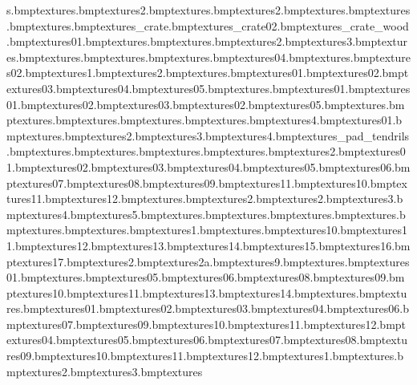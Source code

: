 s\electricfence.bmp textures\electricfencewall.bmp textures\electricfencewall2.bmp textures\electricfencewire.bmp textures\electricfencewire2.bmp textures\elephanteye.bmp textures\elephanttoes.bmp textures\elephantwrinkles.bmp textures\exp_crate.bmp textures\exp_crate02.bmp textures\exp_crate_wood.bmp textures\feather01.bmp textures\frozentreats.bmp textures\gate.bmp textures\grassedge2.bmp textures\grassedge3.bmp textures\grassjoiner.bmp textures\grasswedgeyel.bmp textures\spacestation.bmp textures\hitsignexplan.bmp textures\hubflowers04.bmp textures\hubfootylines.bmp textures\hubpath02.bmp textures\hutbrick1.bmp textures\hutbrick2.bmp textures\hutwallcolours.bmp textures\icecubed01.bmp textures\icecubed02.bmp textures\icecubed03.bmp textures\icecubed04.bmp textures\icecubed05.bmp textures\icewalkway.bmp textures\igloo01.bmp textures\jhutdoor01.bmp textures\jhutdoor02.bmp textures\jhuthatch03.bmp textures\jhutwin02.bmp textures\jhutwin05.bmp textures\leafgreen.bmp textures\leafred.bmp textures\leaftree.bmp textures\lhousewall.bmp textures\lifebuoy.bmp textures\lifehut4.bmp textures\lighthalo01.bmp textures\lillipad.bmp textures\lilo2.bmp textures\lilo3.bmp textures\lilo4.bmp textures\lily_pad_tendrils.bmp textures\logoicekingdome.bmp textures\magenta.bmp textures\metaledges.bmp textures\mountaincloud.bmp textures\mountaincloud2.bmp textures\orangerock01.bmp textures\orangerock02.bmp textures\orangerock03.bmp textures\orangerock04.bmp textures\orangerock05.bmp textures\orangerock06.bmp textures\orangerock07.bmp textures\orangerock08.bmp textures\orangerock09.bmp textures\orangerock11.bmp textures\orangersandsmall10.bmp textures\orangersandsmall11.bmp textures\orangersandsmall12.bmp textures\planetflag.bmp textures\spacestation2.bmp textures\planetx2.bmp textures\planetx3.bmp textures\planetx4.bmp textures\planetx5.bmp textures\planetxgrass.bmp textures\plantspikeblue.bmp textures\plantspikegreen.bmp textures\post.bmp textures\rocketstripes.bmp textures\rope.bmp textures\safaribannervines1.bmp textures\safarifruitree.bmp textures\safarifruitree10.bmp textures\safarifruitree11.bmp textures\safarifruitree12.bmp textures\safarifruitree13.bmp textures\safarifruitree14.bmp textures\safarifruitree15.bmp textures\safarifruitree16.bmp textures\safarifruitree17.bmp textures\safarifruitree2.bmp textures\safarifruitree2a.bmp textures\safarifruitree9.bmp textures\safarifruitreea.bmp textures\safarigrill01.bmp textures\safaritemple.bmp textures\safaritemple05.bmp textures\safaritemple06.bmp textures\safaritemple08.bmp textures\safaritemple09.bmp textures\safaritemple10.bmp textures\safaritemple11.bmp textures\safaritemple13.bmp textures\safaritemple14.bmp textures\safariwater.bmp textures\saflogo.bmp textures\safrock01.bmp textures\safrock02.bmp textures\safrock03.bmp textures\safrock04.bmp textures\safrock06.bmp textures\safrock07.bmp textures\safrock09.bmp textures\safrock10.bmp textures\safrock11.bmp textures\safrock12.bmp textures\safrockcream04.bmp textures\safrockcream05.bmp textures\safrockcream06.bmp textures\safrockcream07.bmp textures\safrockcream08.bmp textures\safrockcream09.bmp textures\safrockcream10.bmp textures\safrockcream11.bmp textures\safrockcream12.bmp textures\safsign1.bmp textures\safwarmwood.bmp textures\safwarmwood2.bmp textures\safwarmwood3.bmp textures\safwarmwoo
